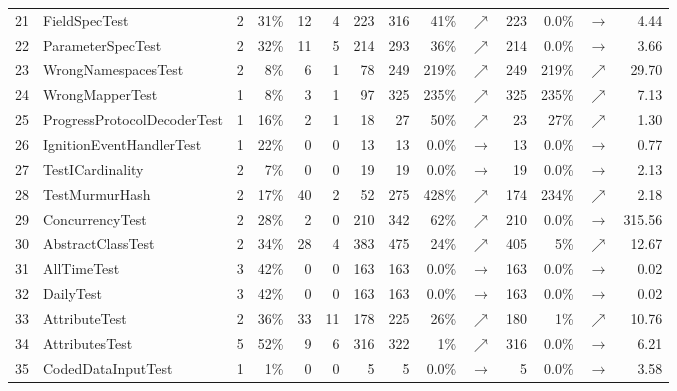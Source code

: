 \documentclass[table,xcdraw,smallextended]{svjour3}
\begin{document}
\begin{table}
\begin{tabular}{|llrrrr|rrrr|rrr|r|}
\hline
21&\scriptsize{FieldSpecTest}&2&31\%&12&4&223&316&41\%&{\color{ForestGreen}$\nearrow$}&223&0.0\%&$\rightarrow$&4.44 \\
\rowcolor[HTML]{EFEFEF}
22&\scriptsize{ParameterSpecTest}&2&32\%&11&5&214&293&36\%&{\color{ForestGreen}$\nearrow$}&214&0.0\%&$\rightarrow$&3.66 \\
23&\scriptsize{WrongNamespacesTest}&2&8\%&6&1&78&249&219\%&{\color{ForestGreen}$\nearrow$}&249&219\%&{\color{ForestGreen}$\nearrow$}&29.70 \\
\rowcolor[HTML]{EFEFEF}
24&\scriptsize{WrongMapperTest}&1&8\%&3&1&97&325&235\%&{\color{ForestGreen}$\nearrow$}&325&235\%&{\color{ForestGreen}$\nearrow$}&7.13 \\
25&\scriptsize{ProgressProtocolDecoderTest}&1&16\%&2&1&18&27&50\%&{\color{ForestGreen}$\nearrow$}&23&27\%&{\color{ForestGreen}$\nearrow$}&1.30 \\
\rowcolor[HTML]{EFEFEF}
26&\scriptsize{IgnitionEventHandlerTest}&1&22\%&0&0&13&13&0.0\%&$\rightarrow$&13&0.0\%&$\rightarrow$&0.77 \\
27&\scriptsize{TestICardinality}&2&7\%&0&0&19&19&0.0\%&$\rightarrow$&19&0.0\%&$\rightarrow$&2.13 \\
\rowcolor[HTML]{EFEFEF}
28&\scriptsize{TestMurmurHash}&2&17\%&40&2&52&275&428\%&{\color{ForestGreen}$\nearrow$}&174&234\%&{\color{ForestGreen}$\nearrow$}&2.18 \\
29&\scriptsize{ConcurrencyTest}&2&28\%&2&0&210&342&62\%&{\color{ForestGreen}$\nearrow$}&210&0.0\%&$\rightarrow$&315.56 \\
\rowcolor[HTML]{EFEFEF}
30&\scriptsize{AbstractClassTest}&2&34\%&28&4&383&475&24\%&{\color{ForestGreen}$\nearrow$}&405&5\%&{\color{ForestGreen}$\nearrow$}&12.67 \\
31&\scriptsize{AllTimeTest}&3&42\%&0&0&163&163&0.0\%&$\rightarrow$&163&0.0\%&$\rightarrow$&0.02 \\
\rowcolor[HTML]{EFEFEF}
32&\scriptsize{DailyTest}&3&42\%&0&0&163&163&0.0\%&$\rightarrow$&163&0.0\%&$\rightarrow$&0.02 \\
33&\scriptsize{AttributeTest}&2&36\%&33&11&178&225&26\%&{\color{ForestGreen}$\nearrow$}&180&1\%&{\color{ForestGreen}$\nearrow$}&10.76 \\
\rowcolor[HTML]{EFEFEF}
34&\scriptsize{AttributesTest}&5&52\%&9&6&316&322&1\%&{\color{ForestGreen}$\nearrow$}&316&0.0\%&$\rightarrow$&6.21 \\
35&\scriptsize{CodedDataInputTest}&1&1\%&0&0&5&5&0.0\%&$\rightarrow$&5&0.0\%&$\rightarrow$&3.58 \\

\end{tabular}
\end{table}
\end{document}

